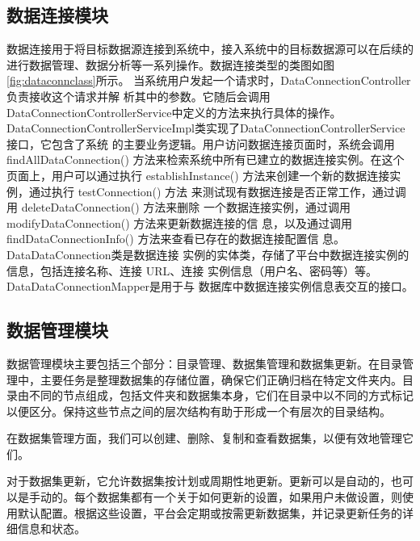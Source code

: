 \subsection{数据连接模块}
数据连接用于将目标数据源连接到系统中，接入系统中的目标数据源可以在后续的进行数据管理、数据分析等一系列操作。数据连接类型的类图如图\ref{fig:dataconnclass}所示。
%     
当系统用户发起一个请求时，DataConnectionController负责接收这个请求并解
析其中的参数。它随后会调用DataConnectionControllerService中定义的方法来执行具体的操作。DataConnectionControllerServiceImpl类实现了DataConnectionControllerService接口，它包含了系统
的主要业务逻辑。用户访问数据连接页面时，系统会调用 findAllDataConnection()
方法来检索系统中所有已建立的数据连接实例。在这个页面上，用户可以通过执行
establishInstance() 方法来创建一个新的数据连接实例，通过执行 testConnection() 方法
来测试现有数据连接是否正常工作，通过调用 deleteDataConnection() 方法来删除
一个数据连接实例，通过调用 modifyDataConnection() 方法来更新数据连接的信
息，以及通过调用 findDataConnectionInfo() 方法来查看已存在的数据连接配置信
息。DataDataConnection类是数据连接
实例的实体类，存储了平台中数据连接实例的信息，包括连接名称、连接 URL、连接
实例信息（用户名、密码等）等。DataDataConnectionMapper是用于与
数据库中数据连接实例信息表交互的接口。
\subsection{数据管理模块}
数据管理模块主要包括三个部分：目录管理、数据集管理和数据集更新。在目录管理中，主要任务是整理数据集的存储位置，确保它们正确归档在特定文件夹内。目录由不同的节点组成，包括文件夹和数据集本身，它们在目录中以不同的方式标记以便区分。保持这些节点之间的层次结构有助于形成一个有层次的目录结构。

在数据集管理方面，我们可以创建、删除、复制和查看数据集，以便有效地管理它们。

对于数据集更新，它允许数据集按计划或周期性地更新。更新可以是自动的，也可以是手动的。每个数据集都有一个关于如何更新的设置，如果用户未做设置，则使用默认配置。根据这些设置，平台会定期或按需更新数据集，并记录更新任务的详细信息和状态。

